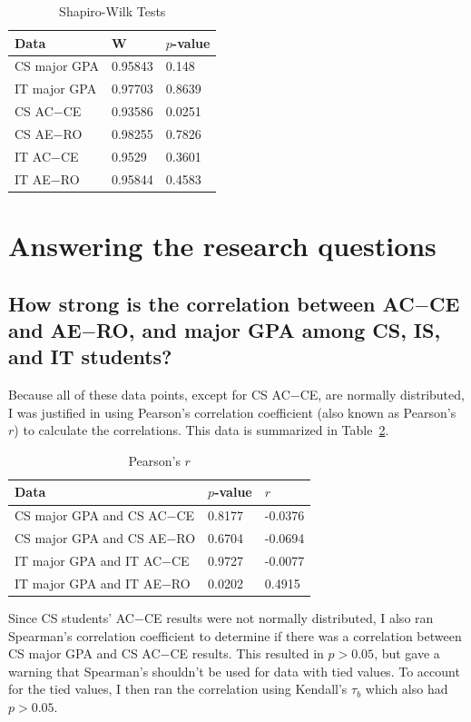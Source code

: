 \begin{table}[!htbp]
  \centering
  \caption{Shapiro-Wilk Tests}
  \label{tab:shapiro-wilk}
  \begin{tabular}{lll}
    \toprule
    Data         & W       & $p$-value \\
    \midrule
    CS major GPA & 0.95843 & 0.148 \\
    IT major GPA & 0.97703 & 0.8639 \\
    CS AC$-$CE     & 0.93586 & 0.0251 \\
    CS AE$-$RO     & 0.98255 & 0.7826 \\
    IT AC$-$CE     & 0.9529  & 0.3601 \\
    IT AE$-$RO     & 0.95844 & 0.4583 \\
    \bottomrule
  \end{tabular}
\end{table}

\section{Answering the research questions}
\subsection{How strong is the correlation between AC$-$CE and AE$-$RO, and major GPA among CS, IS, and IT students?}
Because all of these data points, except for CS AC$-$CE, are normally distributed, I was justified in using Pearson's correlation coefficient (also known as Pearson's $r$) to calculate the correlations. This data is summarized in Table~\ref{tab:pearsons}.

\begin{table}[!htbp]
  \centering
  \caption{Pearson's $r$}
  \label{tab:pearsons}
  \begin{tabular}{lll}
    \toprule
    Data                      & $p$-value & $r$ \\
    \midrule
    CS major GPA and CS AC$-$CE & 0.8177    & -0.0376 \\
    CS major GPA and CS AE$-$RO & 0.6704    & -0.0694 \\
    IT major GPA and IT AC$-$CE & 0.9727    & -0.0077 \\
    IT major GPA and IT AE$-$RO & 0.0202    & 0.4915 \\
    \bottomrule
  \end{tabular}
\end{table}

Since CS students' AC$-$CE results were not normally distributed, I also ran Spearman's correlation coefficient to determine if there was a correlation between CS major GPA and CS AC$-$CE results. This resulted in $p>0.05$, but gave a warning that Spearman's shouldn't be used for data with tied values. To account for the tied values, I then ran the correlation using Kendall's $\tau_b$ which also had $p>0.05$.

